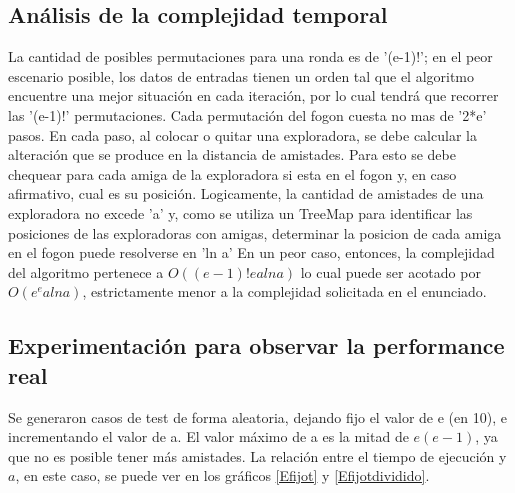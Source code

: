 \subsection{Análisis de la complejidad temporal}
La cantidad de posibles permutaciones para una ronda es de '(e-1)!'; en el peor escenario posible, los datos de entradas tienen un orden tal que el algoritmo encuentre una mejor situación en cada iteración, por lo cual tendrá que recorrer las '(e-1)!' permutaciones. 
Cada permutación del fogon cuesta no mas de '2*e' pasos. En cada paso, al colocar o quitar una exploradora, se debe calcular la alteración que se produce en la distancia de amistades. Para esto se debe chequear para cada amiga de la exploradora si esta en el fogon y, en caso afirmativo, cual es su posición. Logicamente, la cantidad de amistades de una exploradora no excede 'a' y, como se utiliza un TreeMap para identificar las posiciones de las exploradoras con amigas, determinar la posicion de cada amiga en el fogon puede resolverse en 'ln a'
En un peor caso, entonces, la complejidad del algoritmo pertenece a $O( (e-1)! e a ln a)$ lo cual puede ser acotado por $O(e^e a lna)$, estrictamente menor a la complejidad solicitada en el enunciado.



\subsection{Experimentación para observar la performance real}



Se generaron casos de test de forma aleatoria, dejando fijo el valor de e (en 10), e incrementando el valor de a. El valor máximo de a es la mitad de $e (e-1)$, ya que no es posible tener más amistades. La relación entre el tiempo de ejecución y $a$, en este caso, se puede ver en los gráficos \ref{Efijot} y \ref{Efijotdividido}.


